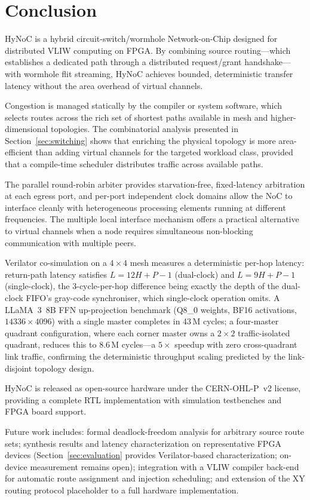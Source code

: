 \section{Conclusion}
\label{sec:conclusion}

HyNoC is a hybrid circuit-switch/wormhole Network-on-Chip designed for distributed
VLIW computing on FPGA. By combining source routing---which establishes a dedicated
path through a distributed request/grant handshake---with wormhole flit streaming,
HyNoC achieves bounded, deterministic transfer latency without the area overhead of
virtual channels.

Congestion is managed statically by the compiler or system software, which selects
routes across the rich set of shortest paths available in mesh and
higher-dimensional topologies. The combinatorial analysis presented in
Section~\ref{sec:switching} shows that enriching the physical topology is more
area-efficient than adding virtual channels for the targeted workload class,
provided that a compile-time scheduler distributes traffic across available paths.

The parallel round-robin arbiter provides starvation-free, fixed-latency
arbitration at each egress port, and per-port independent clock domains allow the
NoC to interface cleanly with heterogeneous processing elements running at
different frequencies. The multiple local interface mechanism offers a practical
alternative to virtual channels when a node requires simultaneous non-blocking
communication with multiple peers.

Verilator co-simulation on a $4\times4$ mesh measures a deterministic per-hop
latency: return-path latency satisfies $L=12H+P-1$ (dual-clock) and
$L=9H+P-1$ (single-clock), the $3$-cycle-per-hop difference being exactly the
depth of the dual-clock FIFO's gray-code synchroniser, which single-clock
operation omits.  A
LLaMA~3~8B FFN up-projection benchmark (Q8\_0 weights, BF16 activations,
$14336\times4096$) with a single master completes in 43\,M cycles; a
four-master quadrant configuration, where each corner master owns a $2\times2$
traffic-isolated quadrant, reduces this to 8.6\,M cycles---a $5\times$ speedup
with zero cross-quadrant link traffic, confirming the deterministic
throughput scaling predicted by the link-disjoint topology design.

HyNoC is released as open-source hardware under the CERN-OHL-P~v2 license,
providing a complete RTL implementation with simulation testbenches and FPGA board
support.

Future work includes: formal deadlock-freedom analysis for arbitrary source route
sets; synthesis results and latency characterization on representative FPGA
devices (Section~\ref{sec:evaluation} provides Verilator-based characterization;
on-device measurement remains open); integration with a VLIW compiler back-end
for automatic route assignment and injection scheduling; and extension of the XY
routing protocol placeholder to a full hardware implementation.
